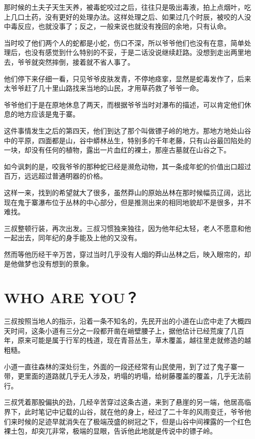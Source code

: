 那时候的土夫子天生天养，被毒蛇咬过之后，往往只是吸出毒液，拍上点烟叶，吃上几口土药，没有更好的处理办法。这样处理之后、如果过几个时辰，被咬的人没中毒反应，也就没事了；反之，一般来说也就没有挽回的余地，只有认命。

当时咬了他们两个人的蛇都是小蛇，伤口不深，所以爷爷他们也没有在意，简单处理后，也没有感觉到什么特别的不妥，于是二话没说继续赶路。没想到走出两里地去，爷爷就突然摔倒，接着就不省人事了。

他们停下来仔细一看，只见爷爷皮肤发青，不停地痉挛，显然是蛇毒发作了，后来太爷爷赶了几十里山路找来当地的山民，才用草药救了爷爷一命。

爷爷他们于是在原地休息了两天，而根据爷爷当时对瀑布的描述，可以肯定他们休息的地方应该是鬼于寨。

这件事情发生之后的第四天，他们到达了那个叫做镖子岭的地方。那地方地处山谷中的平原，四面都是山，谷中蟒林丛生，特别多的千年老藤，只有山谷最凹陷处的一块，却没有任何的植物，露出一片血红的裸土，那座古墓就在山谷之下。

如今讽刺的是，咬我爷爷的那种蛇已经是濒危动物，其一条成年蛇的价值出口超过百万，远远超过普通明器的价格。

这样一来，找到的希望就大了很多，虽然莽山的原始丛林在那时候幅员辽阔，远比现在鬼于寨瀑布位于丛林的中心部分，但是推测出来的相同地貌却不是很多，并不难找。

三叔整顿行装，再次出发。三叔习惯独来独往，因为他年纪太轻，老人不愿意和他一起出去，同年纪的身手能及上他的又没有。

然而等他历经干辛万苦，穿过当时几乎没有人烟的莽山丛林之后，映入眼帘的，却是他做梦也没有想到的景象。

\chapter{WHO ARE YOU？}

三叔按照当地人的指示，沿着一条不知名的，先民开出的小道在山峦中走了大概四天时间，这条小道有三分之一段都开凿在峭壁腰子上，据他估计已经荒废了几百年，原来可能是属于行军的栈道，现在青苔丛生，草木覆盖，越往里走就修造的越粗糙。

小道一直往森林的深处衍生，外面的一段还经常有山民使用，到了过了鬼子寨一带，更里面的道路就几乎无人涉及，坍塌的坍塌，给树藤覆盖的覆盖，几乎无法前行。

三叔凭着那股偏执的劲，几经辛苦穿过这条古道，来到了悬崖的另一端，他居高临界下，此时笔记中记载的山谷，就在他的身上，经过了二十年的风雨变迁，爷爷他们来时候的足迹早就消失在了极端茂盛的树冠之下，但是山谷中间裸露的一个红色裸土包，却突兀非常，极端的显眼，告诉他此地就是传说中的镖子岭。

